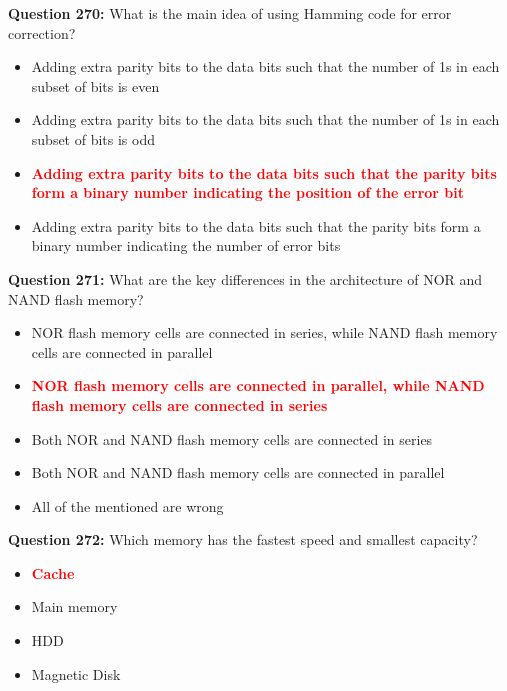\documentclass[12pt,a4paper]{article}
\begin{document}
\vspace{0.5cm}

\textbf{Question 270:} What is the main idea of using Hamming code for error correction?

\begin{itemize}
    \item[\textbf{A.}] Adding extra parity bits to the data bits such that the number of 1s in each subset of bits is even
    \item[\textbf{B.}] Adding extra parity bits to the data bits such that the number of 1s in each subset of bits is odd
    \item[\textbf{C.}] \textcolor{red}{\textbf{Adding extra parity bits to the data bits such that the parity bits form a binary number indicating the position of the error bit}}
    \item[\textbf{D.}] Adding extra parity bits to the data bits such that the parity bits form a binary number indicating the number of error bits
\end{itemize}

\vspace{0.5cm}

\textbf{Question 271:} What are the key differences in the architecture of NOR and NAND flash memory?

\begin{itemize}
    \item[\textbf{A.}] NOR flash memory cells are connected in series, while NAND flash memory cells are connected in parallel
    \item[\textbf{B.}] \textcolor{red}{\textbf{NOR flash memory cells are connected in parallel, while NAND flash memory cells are connected in series}}
    \item[\textbf{C.}] Both NOR and NAND flash memory cells are connected in series
    \item[\textbf{D.}] Both NOR and NAND flash memory cells are connected in parallel
    \item[\textbf{E.}] All of the mentioned are wrong
\end{itemize}

\vspace{0.5cm}

\textbf{Question 272:} Which memory has the fastest speed and smallest capacity?

\begin{itemize}
    \item[\textbf{A.}] \textcolor{red}{\textbf{Cache}}
    \item[\textbf{B.}] Main memory
    \item[\textbf{C.}] HDD
    \item[\textbf{D.}] Magnetic Disk
\end{itemize}
\end{document}
